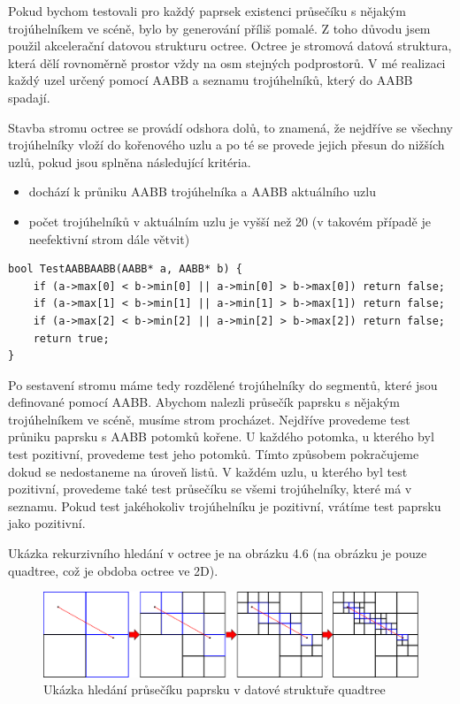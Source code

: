 \documentclass[11pt,twoside,a4paper]{book}
\begin{document}
Pokud bychom testovali pro každý paprsek existenci průsečíku s nějakým trojúhelníkem ve scéně, bylo by generování příliš pomalé. Z toho důvodu jsem použil akcelerační datovou strukturu octree. Octree je stromová datová struktura, která dělí rovnoměrně prostor vždy na osm stejných podprostorů. V mé realizaci každý uzel určený pomocí AABB a seznamu trojúhelníků, který do AABB spadají.

Stavba stromu octree se provádí odshora dolů, to znamená, že nejdříve se všechny trojúhelníky vloží do kořenového uzlu a po té se provede jejich přesun do nižších uzlů, pokud jsou splněna následující kritéria.
\begin{itemize}
\item dochází k průniku AABB trojúhelníka a AABB aktuálního uzlu
\item počet trojúhelníků v aktuálním uzlu je vyšší než 20 (v takovém případě je neefektivní strom dále větvit)
\end{itemize}

\lstset{language=C++} 
\begin{lstlisting}[caption=Průnik dvou AABB ve 3D]
bool TestAABBAABB(AABB* a, AABB* b) {
    if (a->max[0] < b->min[0] || a->min[0] > b->max[0]) return false;
    if (a->max[1] < b->min[1] || a->min[1] > b->max[1]) return false;
    if (a->max[2] < b->min[2] || a->min[2] > b->max[2]) return false;
    return true;
}
\end{lstlisting}

Po sestavení stromu máme tedy rozdělené trojúhelníky do segmentů, které jsou definované pomocí AABB. Abychom nalezli průsečík paprsku s nějakým trojúhelníkem ve scéně, musíme strom procházet. Nejdříve provedeme test průniku paprsku s AABB potomků kořene. U každého potomka, u kterého byl test pozitivní, provedeme test jeho potomků. Tímto způsobem pokračujeme dokud se nedostaneme na úroveň listů. V každém uzlu, u kterého byl test pozitivní, provedeme také test průsečíku se všemi trojúhelníky, které má v seznamu. Pokud test jakéhokoliv trojúhelníku je pozitivní, vrátíme test paprsku jako pozitivní.

Ukázka rekurzivního hledání v octree je na obrázku 4.6 (na obrázku je pouze quadtree, což je obdoba octree ve 2D).

\begin{center}
\begin{figure}[h]
\includegraphics[width=150mm]{figures/quadtree.png}
\caption{Ukázka hledání průsečíku paprsku v datové struktuře quadtree}
\end{figure}
\end{center}
\end{document}
